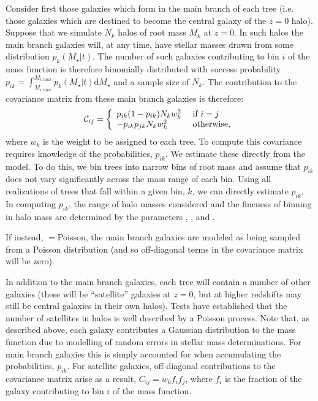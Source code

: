 Consider first those galaxies which form in the main branch of each tree (i.e. those galaxies which are destined to become the central galaxy of the $z=0$ halo). Suppose that we simulate $N_k$ halos of root mass $M_k$ at $z=0$. In such halos the main branch galaxies will, at any time, have stellar masses drawn from some distribution $p_k(M_\star|t)$. The number of such galaxies contributing to bin $i$ of the mass function is therefore binomially distributed with success probability $p_{ik} = \int_{M_{i,\mathrm min}}^{M_{i,\mathrm max}} p_k(M_\star|t) \mathrm{d} M_\star$ and a sample size of $N_k$. The contribution to the covariance matrix from these main branch galaxies is therefore:
\begin{equation}
 \mathcal{C}_{ij} = \left\{ \begin{array}{ll} p_{ik}(1-p_{ik}) N_k w_k^2 & \hbox{ if } i = j \\ -p_{ik} p_{jk} N_k w_k^2 & \hbox{ otherwise,} \end{array} \right.
\end{equation}
where $w_k$ is the weight to be assigned to each tree. To compute this covariance requires knowledge of the probabilities, $p_{ik}$. We estimate these directly from the model. To do this, we bin trees into narrow bins of root mass and assume that $p_{ik}$ does not vary significantly across the mass range of each bin. Using all realizations of trees that fall within a given bin, $k$, we can directly estimate $p_{ik}$. In computing $p_{ik}$, the range of halo masses considered and the fineness of binning in halo mass are determined by the parameters {\normalfont \ttfamily [analysisMassFunctionsHaloMassMinimum]}, {\normalfont \ttfamily [analysisMassFunctionsHaloMassMaximum]}, and {\normalfont \ttfamily [analysisMassFunctionsHaloMassBinsPerDecade]}.

If instead, {\normalfont \ttfamily [analysisMassFunctionCovarianceModel]}$=${\normalfont \ttfamily Poisson}, the main branch galaxies are modeled as being sampled from a Poisson distribution (and so off-diagonal terms in the covariance matrix will be zero). 

In addition to the main branch galaxies, each tree will contain a number of other galaxies (these will be ``satellite'' galaxies at $z=0$, but at higher redshifts may still be central galaxies in their own halos). Tests have established that the number of satellites in halos is well described by a Poisson process. Note that, as described above, each galaxy contributes a Gaussian distribution to the mass function due to modelling of random errors in stellar mass determinations. For main branch galaxies this is simply accounted for when accumulating the probabilities, $p_{ik}$. For satellite galaxies, off-diagonal contributions to the covariance matrix arise as a result, $C_{ij} = w_k f_i f_j$, where $f_i$ is the fraction of the galaxy contributing to bin $i$ of the mass function.

